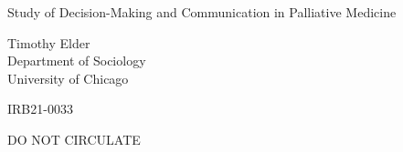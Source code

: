 
\begin{titlepage}
    \begin{center}
        \vspace*{5cm}
 
        \large{Study of Decision-Making and Communication in Palliative Medicine}
 
        \vspace{2cm}
 
        Timothy Elder \\
        Department of Sociology \\
        University of Chicago \\
 
        \vfill
             
        IRB21-0033
             
        \vspace{0.8cm}
          
        DO NOT CIRCULATE
             
    \end{center}
 \end{titlepage}